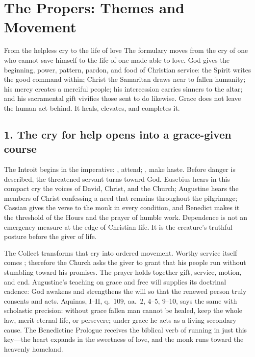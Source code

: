 \section*{The Propers: Themes and Movement}
\label{triptych:brief-synthesis:start}
\begingroup\fontsize{9}{9.8}\selectfont

\begin{studybox}{From the helpless cry to the life of love}
The formulary moves from the cry of one who cannot save himself to the life of
one made able to love. God gives the beginning, power, pattern, pardon, and
food of Christian service: the Spirit writes the good command within; Christ
the Samaritan draws near to fallen humanity; his mercy creates a merciful
people; his intercession carries sinners to the altar; and his sacramental
gift vivifies those sent to do likewise. Grace does not leave the human act
behind. It heals, elevates, and completes it.
\end{studybox}

\subsection*{1. The cry for help opens into a grace-given course }

The Introit begins in the imperative: , attend; ,
make haste. Before danger is described, the threatened servant turns toward
God. Eusebius hears in this compact cry the voices of David, Christ, and the
Church; Augustine hears the members of Christ confessing a need that remains
throughout the pilgrimage; Cassian gives the verse to the monk in every
condition, and Benedict makes it the threshold of the Hours and the prayer of
humble work. Dependence is not an emergency measure at the edge of Christian
life. It is the creature's truthful posture before the giver of life.

The Collect transforms that cry into ordered movement. Worthy service itself
comes ; therefore the Church asks the giver to grant
that his people run without stumbling toward his promises. The prayer holds
together gift, service, motion, and end. Augustine's teaching on grace and free
will supplies its doctrinal cadence: God awakens and strengthens the will so
that the renewed person truly consents and acts. Aquinas,  I--II,
q.~109, aa.~2, 4--5, 9--10, says the same with scholastic precision: without
grace fallen man cannot be healed, keep the whole law, merit eternal life, or
persevere; under grace he acts as a living secondary cause. The Benedictine Prologue receives the biblical verb of
running in just this key---the heart expands in the sweetness of love, and the
monk runs toward the heavenly homeland.

